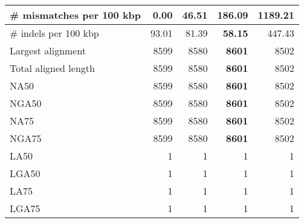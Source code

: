 \documentclass[12pt,a4paper]{article}
\begin{document}
\begin{table}[ht]
\begin{center}
\begin{tabular}{|l*{4}{|r}|}
\# mismatches per 100 kbp & {\bf 0.00} & 46.51 & 186.09 & 1189.21 \\ \hline
\# indels per 100 kbp & 93.01 & 81.39 & {\bf 58.15} & 447.43 \\ \hline
Largest alignment & 8599 & 8580 & {\bf 8601} & 8502 \\ \hline
Total aligned length & 8599 & 8580 & {\bf 8601} & 8502 \\ \hline
NA50 & 8599 & 8580 & {\bf 8601} & 8502 \\ \hline
NGA50 & 8599 & 8580 & {\bf 8601} & 8502 \\ \hline
NA75 & 8599 & 8580 & {\bf 8601} & 8502 \\ \hline
NGA75 & 8599 & 8580 & {\bf 8601} & 8502 \\ \hline
LA50 & 1 & 1 & 1 & 1 \\ \hline
LGA50 & 1 & 1 & 1 & 1 \\ \hline
LA75 & 1 & 1 & 1 & 1 \\ \hline
LGA75 & 1 & 1 & 1 & 1 \\ \hline
\end{tabular}
\end{center}
\end{table}
\end{document}
